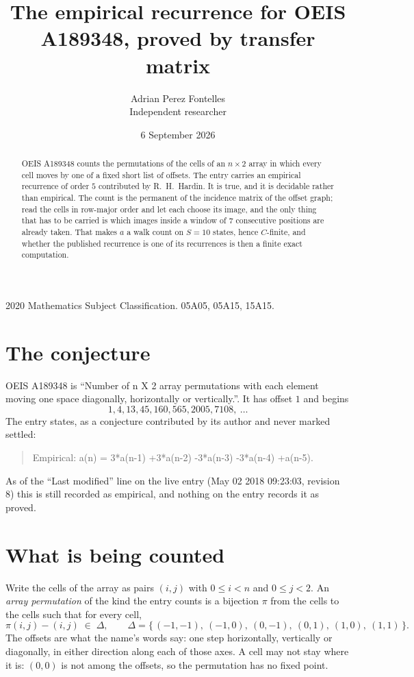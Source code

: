 \documentclass[11pt,a4paper]{article}
\title{The empirical recurrence for OEIS A189348, proved by transfer matrix}
\author{Adrian Perez Fontelles\\ \small Independent researcher}
\date{6 September 2026}
\theoremstyle{plain}
\theoremstyle{definition}
\begin{document}
\maketitle

\begin{abstract}
OEIS A189348 counts the permutations of the cells of an $n\times2$ array in which every cell
moves by one of a fixed short list of offsets. The entry carries an empirical recurrence of
order $5$ contributed by R.~H.~Hardin. It is true, and it is decidable rather than
empirical. The count is the permanent of the incidence matrix of the offset graph; read the
cells in row-major order and let each choose its image, and the only thing that has to be
carried is which images inside a window of $7$ consecutive positions are already taken.
That makes $a$ a walk count on $S=10$ states, hence $C$-finite, and whether the published
recurrence is one of its recurrences is then a finite exact computation.
\end{abstract}

\noindent\small 2020 Mathematics Subject Classification. 05A05, 05A15, 15A15.\normalsize

\section{The conjecture}

OEIS A189348 is ``Number of n X 2 array permutations with each element moving one space diagonally, horizontally or vertically.''. It has offset $1$ and begins
\[
1, 4, 13, 45, 160, 565, 2005, 7108,\ \dots
\]
The entry states, as a conjecture contributed by its author and never marked settled:
\begin{quote}
Empirical: a(n) = 3*a(n-1) +3*a(n-2) -3*a(n-3) -3*a(n-4) +a(n-5).
\end{quote}
As of the ``Last modified'' line on the live entry (May 02 2018 09:23:03, revision 8) this is still
recorded as empirical, and nothing on the entry records it as proved.

\section{What is being counted}

Write the cells of the array as pairs $(i,j)$ with $0\le i<n$ and $0\le j<2$. An
\emph{array permutation} of the kind the entry counts is a bijection $\pi$ from the cells to
the cells such that for every cell,
\[
\pi(i,j)-(i,j)\;\in\;\Delta,\qquad
\Delta=\{\,(-1,-1),\ (-1,0),\ (0,-1),\ (0,1),\ (1,0),\ (1,1)\,\}.
\]
The offsets are what the name's words say: one step horizontally, vertically or diagonally, in either direction along each of those axes. A cell may not stay where it is: $(0,0)$ is not among the offsets, so the permutation has no fixed point.
\end{document}
